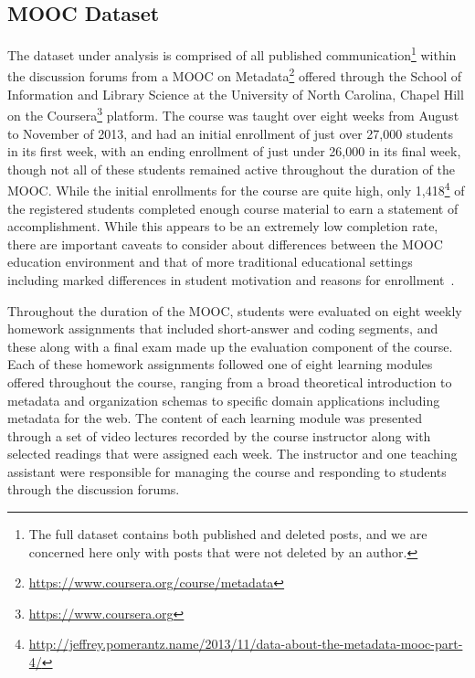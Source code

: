 \documentclass[twoside]{article}
\begin{document}
\subsection{MOOC Dataset}
The dataset under analysis is comprised of all published communication\footnote{The full dataset contains both published and deleted posts, and we are concerned here only with posts that were not deleted by an author.} within the discussion forums from a MOOC on Metadata\footnote{\url{https://www.coursera.org/course/metadata}} offered through the School of Information and Library Science at the University of North Carolina, Chapel Hill on the Coursera\footnote{\url{https://www.coursera.org}} platform. The course was taught over eight weeks from August to November of 2013, and had an initial enrollment of just over 27,000 students in its first week, with an ending enrollment of just under 26,000 in its final week, though not all of these students remained active throughout the duration of the MOOC. While the initial enrollments for the course are quite high, only 1,418\footnote{\url{http://jeffrey.pomerantz.name/2013/11/data-about-the-metadata-mooc-part-4/} } of the registered students completed enough course material to earn a statement of accomplishment. While this appears to be an extremely low completion rate, there are important caveats to consider about differences between the MOOC education environment and that of more traditional educational settings including marked differences in student motivation and reasons for enrollment~\cite{koller2013retention}.
\par
Throughout the duration of the MOOC, students were evaluated on eight weekly homework assignments that included short-answer and coding segments, and these along with a final exam made up the evaluation component of the course. Each of these homework assignments followed one of eight learning modules offered throughout the course, ranging from a broad theoretical introduction to metadata and organization schemas to specific domain applications including metadata for the web. The content of each learning module was presented through a set of video lectures recorded by the course instructor along with selected readings that were assigned each week. The instructor and one teaching assistant were responsible for managing the course and responding to students through the discussion forums.
\par
\end{document}
